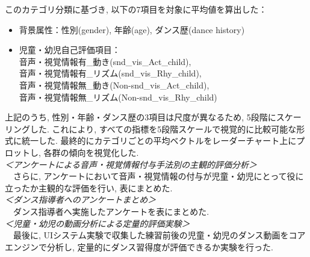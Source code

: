 \documentclass[paper]{ieicej}
\begin{document}
このカテゴリ分類に基づき, 以下の7項目を対象に平均値を算出した：
\begin{itemize}[nosep]
  \item 背景属性：性別(gender), 年齢(age), ダンス歴(dance history)
  \item 児童・幼児自己評価項目：\\
        音声・視覚情報有\_動き(snd\_vis\_Act\_child),\\
        音声・視覚情報有\_リズム(snd\_vis\_Rhy\_child),\\
        音声・視覚情報無\_動き(Non-snd\_vis\_Act\_child),\\
        音声・視覚情報無\_リズム(Non-snd\_vis\_Rhy\_child) 
\end{itemize}
上記のうち, 性別・年齢・ダンス歴の3項目は尺度が異なるため, 5段階にスケーリングした. これにより, すべての指標を5段階スケールで視覚的に比較可能な形式に統一した. 最終的にカテゴリごとの平均ベクトルをレーダーチャート上にプロットし, 各群の傾向を視覚化した. \\
\textit{＜アンケートによる音声・視覚情報付与手法別の主観的評価分析＞}\\
　さらに, アンケートにおいて音声・視覚情報の付与が児童・幼児にとって役に立ったか主観的な評価を行い, 表にまとめた. \\
\textit{＜ダンス指導者へのアンケートまとめ＞}\\
　ダンス指導者へ実施したアンケートを表にまとめた. \\
\textit{＜児童・幼児の動画分析による定量的評価実験＞}\\
　最後に, UIシステム実験で収集した練習前後の児童・幼児のダンス動画をコアエンジンで分析し, 定量的にダンス習得度が評価できるか実験を行った. 
\end{document}
